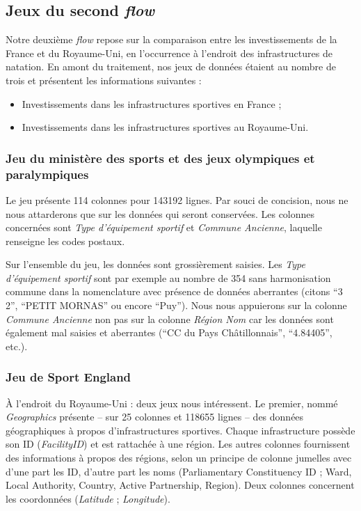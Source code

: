 \documentclass[hidelinks, 12pt]{article}
\begin{document}
\subsection{Jeux du second \emph{flow}}

Notre deuxième \emph{flow} repose sur la comparaison entre les investissements de la France et du Royaume-Uni, en l'occurrence à l'endroit des infrastructures de natation. En amont du traitement, nos jeux de données étaient au nombre de trois et présentent les informations suivantes :

\begin{itemize}
	\item Investissements dans les infrastructures sportives en France\autocite{ministere} ;
	\item Investissements dans les infrastructures sportives au Royaume-Uni\autocite{ru}.
\end{itemize}


\subsubsection{Jeu du ministère des sports et des jeux olympiques et paralympiques}

Le jeu présente 114 colonnes pour 143192 lignes. Par souci de concision, nous ne nous attarderons que sur les données qui seront conservées. Les colonnes concernées sont \emph{Type d'équipement sportif} et \emph{Commune Ancienne}, laquelle renseigne les codes postaux.

Sur l'ensemble du jeu, les données sont grossièrement saisies. Les \emph{Type d'équipement sportif} sont par exemple au nombre de 354 sans harmonisation commune dans la nomenclature avec présence de données aberrantes (citons \enquote{3 2}, \enquote{PETIT MORNAS} ou encore \enquote{Puy}). Nous nous appuierons sur la colonne \emph{Commune Ancienne} non pas sur la colonne \emph{Région Nom} car les données sont également mal saisies et aberrantes (\enquote{CC du Pays Châtillonnais}, \enquote{4.84405}, etc.).

\subsubsection{Jeu de Sport England}

À l'endroit du Royaume-Uni : deux jeux nous intéressent. Le premier, nommé \emph{Geographics} présente -- sur 25 colonnes et 118655 lignes -- des données géographiques à propos d'infrastructures sportives. Chaque infrastructure possède son ID (\emph{FacilityID}) et est rattachée à une région. Les autres colonnes fournissent des informations à propos des régions, selon un principe de colonne jumelles avec d'une part les ID, d'autre part les noms (Parliamentary Constituency ID ; Ward, Local Authority, Country, Active Partnership, Region). Deux colonnes concernent les coordonnées (\emph{Latitude} ; \emph{Longitude}).
\end{document}
